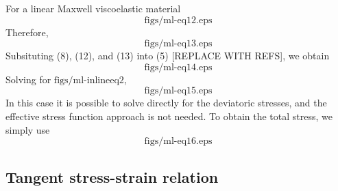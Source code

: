 For a linear Maxwell viscoelastic material
\begin{equation}
  \text{figs/ml-eq12.eps}
\end{equation}
Therefore,
\begin{equation}
  \text{figs/ml-eq13.eps}
\end{equation}
Subsituting (8), (12), and (13) into (5) [REPLACE WITH REFS], we obtain
\begin{equation}
  \text{figs/ml-eq14.eps}
\end{equation}
Solving for  $\text{figs/ml-inlineeq2}$,
\begin{equation}
  \text{figs/ml-eq15.eps}
\end{equation}
In this case it is possible to solve directly for the deviatoric
stresses, and the effective stress function approach is not needed. To
obtain the total stress, we simply use
\begin{equation}
  \text{figs/ml-eq16.eps}
\end{equation}

\subsection{Tangent stress-strain relation}

